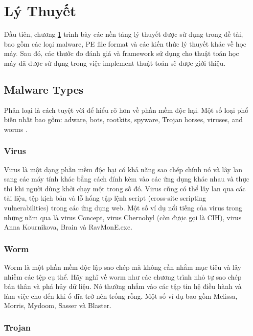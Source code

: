 \chapter{Lý Thuyết}
\label{chap:background}
\graphicspath{{Chapter3/Figs/}}

\begin{chapabstract}
Đầu tiên, chương \ref{chap:background} trình bày các nền tảng lý thuyết được sử dụng trong đề tài, bao gồm các loại malware, PE file format và các kiến thức lý thuyết khác về học máy. Sau đó, các thước đo đánh giá và framework sử dụng cho thuật toán học máy đã được sử dụng trong việc implement thuật toán sẽ được giới thiệu.
\end{chapabstract}

\section{Malware Types}
\label{sec:malware}

Phân loại là cách tuyệt vời để hiểu rõ hơn về phần mềm độc hại. Một số loại phổ biến nhất bao gồm: adware, bots, rootkits, spyware, Trojan horses, viruses, and worms \cite{neil2012common}.

\subsection{Virus}

Virus là một dạng phần mềm độc hại có khả năng sao chép chính nó và lây lan sang các máy tính khác bằng cách đính kèm vào các ứng dụng khác nhau và thực thi khi người dùng khởi chạy một trong số đó. Virus cũng có thể lây lan qua các tài liệu, tệp kịch bản và lỗ hổng tập lệnh script (cross-site scripting vulnerabilities) trong các ứng dụng web. Một số ví dụ nổi tiếng của virus trong những năm qua là virus Concept, virus Chernobyl (còn được gọi là CIH), virus Anna Kournikova, Brain và RavMonE.exe.

\subsection{Worm}

Worm là một phần mềm độc lập sao chép mà không cần nhắm mục tiêu và lây nhiễm các tệp cụ thể. Hãy nghĩ về worm như các chương trình nhỏ tự sao chép bản thân và phá hủy dữ liệu. Nó thường nhắm vào các tập tin hệ điều hành và làm việc cho đến khi ổ đĩa trở nên trống rỗng. Một số ví dụ bao gồm Melissa, Morris, Mydoom, Sasser và Blaster.

\subsection{Trojan}

